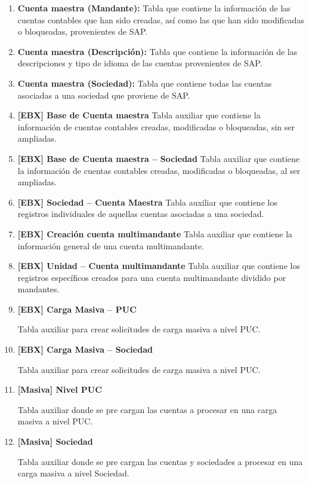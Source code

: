 \begin{enumerate}
    \item \textbf{Cuenta maestra (Mandante):}
    Tabla que contiene la información de las cuentas contables que han sido creadas, así como las que han sido modificadas o bloqueadas, provenientes de SAP.
    
    \item \textbf{Cuenta maestra (Descripción):}
    Tabla que contiene la información de las descripciones y tipo de idioma de las cuentas provenientes de SAP.

    \item \textbf{Cuenta maestra (Sociedad):}
    Tabla que contiene todas las cuentas asociadas a una sociedad que proviene de SAP.
    
    \item \textbf{[EBX] Base de Cuenta maestra}
    Tabla auxiliar que contiene la información de cuentas contables creadas, modificadas o bloqueadas, sin ser ampliadas.
    
    \item \textbf{[EBX] Base de Cuenta maestra – Sociedad}
    Tabla auxiliar que contiene la información de cuentas contables creadas, modificadas o bloqueadas, al ser ampliadas.
    
    \item \textbf{[EBX] Sociedad – Cuenta Maestra}
    Tabla auxiliar que contiene los registros individuales de aquellas cuentas asociadas a una sociedad.
    
    \item \textbf{[EBX] Creación cuenta multimandante}
    Tabla auxiliar que contiene la información general de una cuenta multimandante.
    
    \item \textbf{[EBX] Unidad – Cuenta multimandante}
    Tabla auxiliar que contiene los registros específicos creados para una cuenta multimandante dividido por mandantes.
    
    \item \textbf{[EBX] Carga Masiva – PUC}

    Tabla auxiliar para crear solicitudes de carga masiva a nivel PUC.

    \item \textbf{[EBX] Carga Masiva – Sociedad}

    Tabla auxiliar para crear solicitudes de carga masiva a nivel PUC.

    \item \textbf{[Masiva] Nivel PUC}

    Tabla auxiliar donde se pre cargan las cuentas a procesar en una carga masiva a nivel PUC.

    \item \textbf{[Masiva] Sociedad}

    Tabla auxiliar donde se pre cargan las cuentas y sociedades a procesar en una carga masiva a nivel Sociedad.
\end{enumerate}

